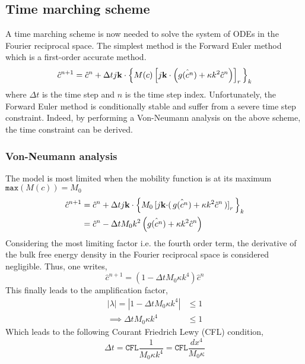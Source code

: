 \subsection{Time marching scheme}
    A time marching scheme is now needed to solve the system of ODEs in the Fourier reciprocal space. The simplest method is the Forward Euler method which is a first-order accurate method.
    \begin{equation}
        \hat{c}^{n+1} = \hat{c}^n + \Delta t j\mathbf{k} \cdot \Bigl\{ M(c) \left[j\mathbf{k} \cdot \left(\hat{g(c^n)} + \kappa k^2 \hat{c}^n\right)\right]_r \Bigl\}_k
    \end{equation}
    where $\Delta t$ is the time step and $n$ is the time step index.
    Unfortunately, the Forward Euler method is conditionally stable and suffer from a severe time step constraint. Indeed, by performing a Von-Neumann analysis on the above scheme, the time constraint can be derived.
    \subsubsection{Von-Neumann analysis}
    The model is most limited when the mobility function is at its maximum $\texttt{max}(M(c)) = M_0$
    \begin{align*}
        \hat{c}^{n+1} &= \hat{c}^n + \Delta t j\mathbf{k} \cdot \Bigl\{ M_0 \left[j\mathbf{k} \cdot \right(\hat{g(c^n)} + \kappa k^2 \hat{c}^n\left)\right]_r \Bigl\}_k\\
        &= \hat{c}^n - \Delta t M_0 k^2 \left(\hat{g(c^n)} + \kappa k^2 \hat{c}^n \right)
    \end{align*}
    Considering the most limiting factor i.e. the fourth order term, the derivative of the bulk free energy density in the Fourier reciprocal space is considered negligible. Thus, one writes,
    \begin{equation*}
        \hat{c}^{n+1} = \left(1 - \Delta t M_0 \kappa k^4 \right) \hat{c}^n
    \end{equation*}
    This finally leads to the amplification factor,
    \begin{align*}
        |\lambda| = |1 - \Delta t M_0 \kappa k^4| &\leq 1\\
        \implies \Delta t M_0 \kappa k^4 &\leq 1
    \end{align*}
    Which leads to the following Courant Friedrich Lewy (CFL) condition,
    \begin{equation}\label{eq:2-cfl}
        \Delta t = \texttt{CFL} \frac{1}{M_0 \kappa k^4} = \texttt{CFL} \frac{dx^4}{M_0 \kappa}
    \end{equation}
